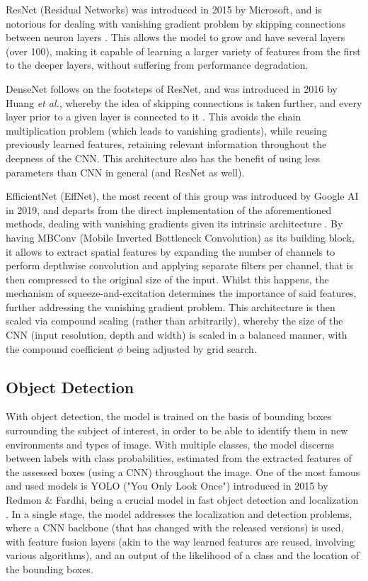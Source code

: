 \documentclass[conference]{IEEEtran}
\begin{document}
ResNet (Residual Networks) was introduced in 2015 by Microsoft, and is notorious for dealing with vanishing gradient problem by skipping connections between neuron layers \cite{ResNet}. This allows the model to grow and have several layers (over 100), making it capable of learning a larger variety of features from the first to the deeper layers, without suffering from performance degradation.

DenseNet follows on the footsteps of ResNet, and was introduced in 2016 by Huang \textit{et al.}, whereby the idea of skipping connections is taken further, and every layer prior to a given layer is connected to it \cite{DenseNet}. This avoids the chain multiplication problem (which leads to vanishing gradients), while reusing previously learned features, retaining relevant information throughout the deepness of the CNN. This architecture also has the benefit of using less parameters than CNN in general (and ResNet as well).

EfficientNet (EffNet), the most recent of this group was introduced by Google AI in 2019, and departs from the direct implementation of the aforementioned methods, dealing with vanishing gradients given its intrinsic architecture \cite{EffienctNet}. By having MBConv (Mobile Inverted Bottleneck Convolution) as its building block, it allows to extract spatial features by expanding the number of channels to perform depthwise convolution and applying separate filters per channel, that is then compressed to the original size of the input. Whilst this happens, the mechanism of squeeze-and-excitation determines the importance of said features, further addressing the vanishing gradient problem. This architecture is then scaled via compound scaling (rather than arbitrarily), whereby the size of the CNN (input resolution, depth and width) is scaled in a balanced manner, with the compound coefficient $\phi$ being adjusted by grid search.

\subsection{Object Detection}

With object detection, the model is trained on the basis of bounding boxes surrounding the subject of interest, in order to be able to identify them in new environments and types of image. With multiple classes, the model discerns between labels with class probabilities, estimated from the extracted features of the assessed boxes (using a CNN) throughout the image. One of the most famous and used models is YOLO ("You Only Look Once") introduced in 2015 by Redmon \& Fardhi, being a crucial model in fast object detection and localization \cite{YOLO}. In a single stage, the model addresses the localization and detection problems, where a CNN backbone (that has changed with the released versions) is used, with feature fusion layers (akin to the way learned features are reused, involving various algorithms), and an output of the likelihood of a class and the location of the bounding boxes.
\end{document}

